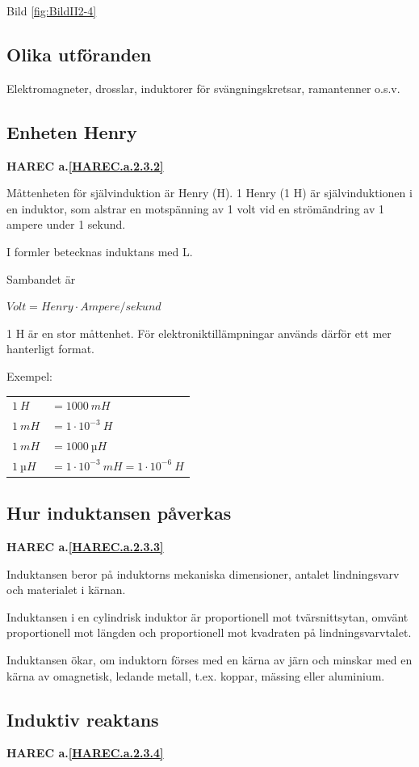 Bild \ref{fig:BildII2-4}

\subsection{Olika utföranden}

Elektromagneter, drosslar, induktorer för svängningskretsar, ramantenner o.s.v.

\subsection{Enheten Henry}
\textbf{HAREC a.\ref{HAREC.a.2.3.2}\label{myHAREC.a.2.3.2}}

Måttenheten för självinduktion är Henry (H). 1 Henry (1 H) är självinduktionen i
en induktor, som alstrar en motspänning av 1 volt vid en strömändring av 1
ampere under 1 sekund.

I formler betecknas induktans med L.

Sambandet är

\(Volt = Henry \cdot Ampere/sekund\)

1 H är en stor måttenhet. För elektroniktillämpningar används därför ett mer
hanterligt format.

Exempel:

\begin{tabular}{ll}
\(1\ H \) & \(= 1000\ mH\) \\
\(1\ mH\) & \(= 1 \cdot 10^{-3}\ H\) \\
\(1\ mH\) & \(= 1000\ µH\) \\
\(1\ µH\) & \(= 1 \cdot 10^{-3}\ mH = 1 \cdot 10^{-6}\ H \)
\end{tabular}

\subsection{Hur induktansen påverkas}
\textbf{HAREC a.\ref{HAREC.a.2.3.3}\label{myHAREC.a.2.3.3}}

Induktansen beror på induktorns mekaniska dimensioner, antalet lindningsvarv och
materialet i kärnan.

Induktansen i en cylindrisk induktor är proportionell mot tvärsnittsytan, omvänt
proportionell mot längden och proportionell mot kvadraten på lindningsvarvtalet.

Induktansen ökar, om induktorn förses med en kärna av järn och minskar med en
kärna av omagnetisk, ledande metall, t.ex. koppar, mässing eller aluminium.

\subsection{Induktiv reaktans}
\textbf{HAREC a.\ref{HAREC.a.2.3.4}\label{myHAREC.a.2.3.4}}

